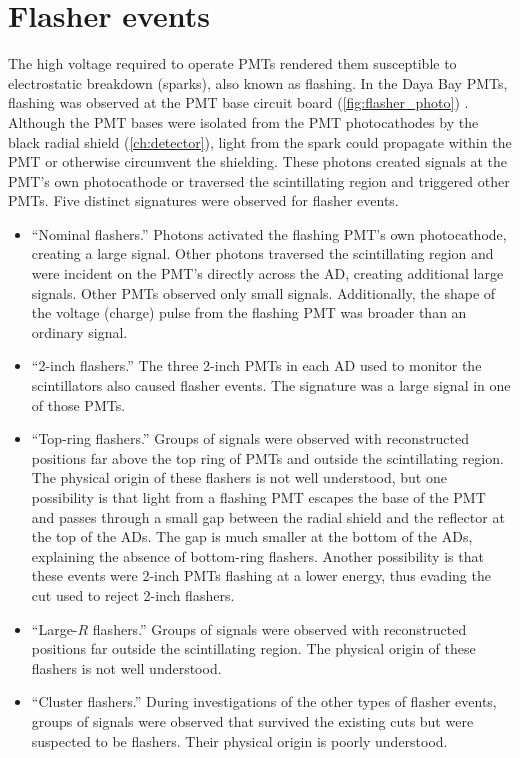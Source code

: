 \section{Flasher events}
\label{sec:flashers}

The high voltage required to operate PMTs rendered them susceptible
to electrostatic breakdown (sparks), also known as flashing.
In the Daya Bay PMTs, flashing was observed
at the PMT base circuit board (\cref{fig:flasher_photo}) \cite{flasherphotos_docdb}.
Although the PMT bases were isolated from the
PMT photocathodes by the black radial shield (\cref{ch:detector}),
light from the spark could propagate within the PMT
or otherwise circumvent the shielding.
These photons created signals at the PMT's own photocathode
or traversed the scintillating region and triggered other PMTs.
Five distinct signatures were observed for flasher events.
\begin{itemize}
    \item ``Nominal flashers.'' Photons activated the flashing PMT's own photocathode,
        creating a large signal.
        Other photons traversed the scintillating region and were incident
        on the PMT's directly across the AD, creating additional large signals.
        Other PMTs observed only small signals.
        Additionally, the shape of the voltage (charge) pulse from the
        flashing PMT was broader than an ordinary signal.
    \item ``2-inch flashers.'' The three 2-inch PMTs in each AD
        used to monitor the scintillators also caused flasher events.
        The signature was a large signal in one of those PMTs.
    \item ``Top-ring flashers.'' Groups of signals were observed
        with reconstructed positions far above the top ring of PMTs
        and outside the scintillating region.
        The physical origin of these flashers is not well understood,
        but one possibility is that light from a flashing PMT
        escapes the base of the PMT
        and passes through a small gap between the radial shield
        and the reflector at the top of the ADs.
        The gap is much smaller at the bottom of the ADs,
        explaining the absence of bottom-ring flashers.
        Another possibility is that these events
        were 2-inch PMTs flashing at a lower energy,
        thus evading the cut used to reject 2-inch flashers.
    \item ``Large-$R$ flashers.'' Groups of signals were observed
        with reconstructed positions far outside the scintillating region.
        The physical origin of these flashers is not well understood.
    \item ``Cluster flashers.''
        During investigations of the other types of flasher events,
        groups of signals were observed that survived the existing cuts
        but were suspected to be flashers.
        Their physical origin is poorly understood.
\end{itemize}

